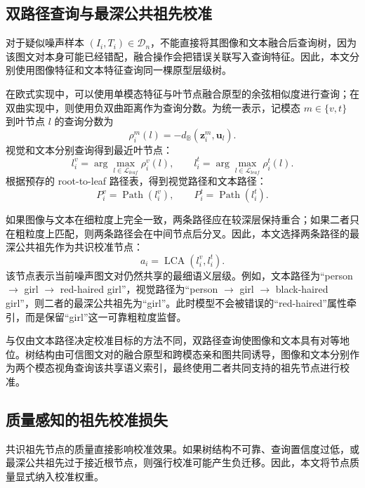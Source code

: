 \subsection{双路径查询与最深公共祖先校准}

对于疑似噪声样本 $(I_i,T_i)\in\mathcal{D}_n$，不能直接将其图像和文本融合后查询树，因为该图文对本身可能已经错配，融合操作会把错误关联写入查询特征。因此，本文分别使用图像特征和文本特征查询同一棵原型层级树。

在欧式实现中，可以使用单模态特征与叶节点融合原型的余弦相似度进行查询；在双曲实现中，则使用负双曲距离作为查询分数。为统一表示，记模态 $m\in\{v,t\}$ 到叶节点 $l$ 的查询分数为
\begin{equation}
    \rho_i^m(l)
    =
    -d_{\mathbb{B}}(\boldsymbol{z}_i^m,\boldsymbol{u}_l).
\end{equation}
视觉和文本分别查询得到最近叶节点：
\begin{equation}
    l_i^v = \arg\max_{l\in\mathcal{L}_{leaf}}\rho_i^v(l),
    \qquad
    l_i^t = \arg\max_{l\in\mathcal{L}_{leaf}}\rho_i^t(l).
\end{equation}
根据预存的 root-to-leaf 路径表，得到视觉路径和文本路径：
\begin{equation}
    P_i^v = \operatorname{Path}(l_i^v),
    \qquad
    P_i^t = \operatorname{Path}(l_i^t).
\end{equation}

如果图像与文本在细粒度上完全一致，两条路径应在较深层保持重合；如果二者只在粗粒度上匹配，则两条路径会在中间节点后分叉。因此，本文选择两条路径的最深公共祖先作为共识校准节点：
\begin{equation}
    a_i = \operatorname{LCA}(l_i^v,l_i^t).
\end{equation}
该节点表示当前噪声图文对仍然共享的最细语义层级。例如，文本路径为“person $\rightarrow$ girl $\rightarrow$ red-haired girl”，视觉路径为“person $\rightarrow$ girl $\rightarrow$ black-haired girl”，则二者的最深公共祖先为“girl”。此时模型不会被错误的“red-haired”属性牵引，而是保留“girl”这一可靠粗粒度监督。

与仅由文本路径决定校准目标的方法不同，双路径查询使图像和文本具有对等地位。树结构由可信图文对的融合原型和跨模态亲和图共同诱导，图像和文本分别作为两个模态视角查询该共享语义索引，最终使用二者共同支持的祖先节点进行校准。

\subsection{质量感知的祖先校准损失}

共识祖先节点的质量直接影响校准效果。如果树结构不可靠、查询置信度过低，或最深公共祖先过于接近根节点，则强行校准可能产生负迁移。因此，本文将节点质量显式纳入校准权重。

